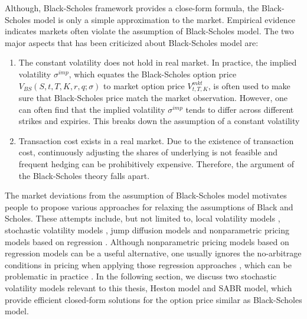 \documentclass[letterpaper,12pt,titlepage,oneside,final]{book}
\numberwithin{equation}{section}
\theoremstyle{definition}
\begin{document}
Although, Black-Scholes framework provides a  close-form formula, the Black-Scholes model is only a simple approximation to the market. Empirical  evidence indicates markets often violate the assumption of   Black-Scholes model. The two major aspects that has been criticized about Black-Scholes model are:
\begin{enumerate}
\item The constant volatility does not hold in real market. In practice, the implied volatility $\sigma^{imp}$, which equates the Black-Scholes option price $V_{BS}(S,t,T,K,r,q;\sigma)$ to market option price $V^{mkt}_{t,T,K}$, is often used to make sure that Black-Scholes price match the market observation. However, one can often find that the implied volatility $\sigma^{imp}$ tends to differ across different strikes and expiries. This breaks down the assumption of a constant volatility
\item Transaction cost exists in a real market. Due to the existence of transaction cost, continuously adjusting the shares of underlying is not feasible and frequent hedging can be prohibitively expensive. Therefore, the argument of the Black-Scholes theory falls apart.
\end{enumerate}
The market deviations from the assumption of Black-Scholes model  motivates people to propose various approaches for relaxing the assumptions of Black and Scholes. These attempts include, but not limited to, local volatility models \citep{coleman2001,dumas1998implied,rubinstein1994implied,dupire1994pricing}, stochastic volatility models \cite{hagan2002managing,heston1993closed,hull1987pricing,bakshi1997empirical}, jump diffusion models \citep{He06,kou2002jump} and nonparametric pricing models based on regression \citep{yao2000option,bennell2004black,gradojevic2009option,garcia2000pricing,malliaris1993neural}. Although nonparametric pricing models based on regression models can be a useful alternative, one usually ignores the no-arbitrage conditions in pricing when applying those regression approaches \citep{yao2000option,bennell2004black,gradojevic2009option,garcia2000pricing,malliaris1993neural}, which can be problematic in practice \cite{itkin2019deep}.
In the following section, we discuss two stochastic volatility models relevant to this thesis, Heston model and SABR model, which provide efficient closed-form solutions for the option price similar as Black-Scholes model.
\end{document}
